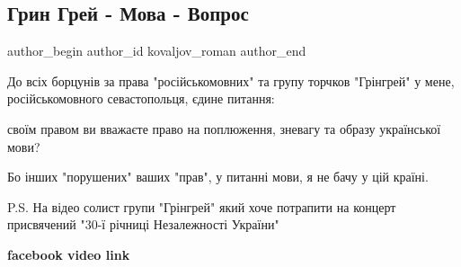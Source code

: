  
 
 
 
 
 
\subsection{Грин Грей - Мова - Вопрос}
\label{sec:27_07_2021.fb.kovaljov_roman.1.grin_grey}
 
\ifcmt
 author_begin
   author_id kovaljov_roman
 author_end
\fi

До всіх борцунів за права "російськомовних" та групу торчков "Грінгрей" у мене,
російськомовного севастопольця, єдине питання:

своїм правом ви вважаєте право на поплюження, зневагу та образу української
мови?

Бо інших "порушених" ваших "прав", у питанні мови, я не бачу у цій країні.

P.S. На відео солист групи "Грінгрей" який хоче потрапити на концерт
присвячений "30-ї річниці Незалежності України"

{\bfseries facebook video link}
